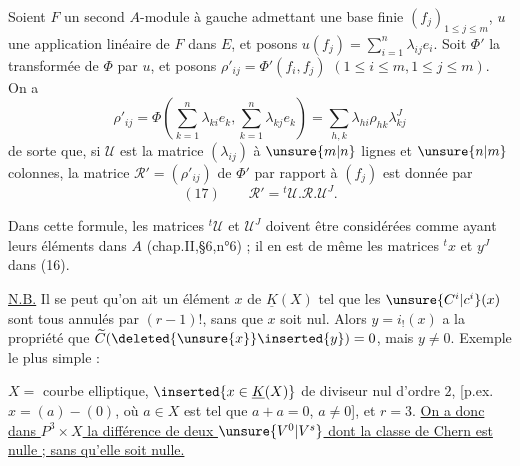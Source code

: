 Soient $F$ un second $A$-module à gauche admettant une base finie $(f_j)_{1\leq j\leq m}$,
$u$ une application linéaire de $F$ dans $E$, et posons
$u(f_j)=\sum_{i=1}^n\lambda_{ij}e_i$. Soit $\Phi'$ la transformée de $\Phi$ par $u$, et posons
$\rho'_{ij}=\Phi'(f_i,f_j)$ $(1\leq i\leq m,1\leq j\leq m)$. On a
\[
\rho'_{ij}=\Phi\left(\sum_{k=1}^n\lambda_{ki}e_k,\sum_{k=1}^n\lambda_{kj}e_k\right)
=\sum_{h,k}\lambda_{hi}\rho_{hk}\lambda_{kj}^J
\]
de sorte que, si $\mathcal U$ est la matrice $(\lambda_{ij})$ à $\unsure{m|n}$ lignes et $\unsure{n|m}$ colonnes,
la matrice $\mathcal R'=(\rho'_{ij})$ de $\Phi'$ par rapport à $(f_j)$ est donnée par
\[
(17)\qquad \mathcal R'={}^t\mathcal U.\mathcal R.\mathcal U^J.
\]

Dans cette formule, les matrices ${}^t\mathcal U$ et $\mathcal U^J$ doivent être considérées comme ayant leurs éléments dans $A$ (chap.II,\S6,n°6) ; il en est de même les matrices ${}^t x$ et $y^J$ dans (16).

\uline{N.B.} Il se peut qu'on ait un élément $x$ de $\underline K(X)$ tel que les
$\unsure{C^i|c^i}(x)$ sont tous annulés par $(r-1)!$, sans que $x$ soit nul.
Alors $y=i_!(x)$ a la propriété que $\widetilde C(\deleted{\unsure{x}}\inserted{y})=0$,
mais $y\ne0$. Exemple le plus simple :

$X=$ courbe elliptique, $\inserted{x\in\underline K(X)}$  de diviseur 
nul d'ordre $2$, [p.ex. $x=(a)-(0)$, où $a\in X$ est tel que $a+a=0$, $a\ne0$], et $r=3$.
\uline{On a donc dans $P^3\times X$ la différence de deux $\unsure{V^0|V^s}$
 dont la classe de Chern est nulle ; sans qu'elle soit nulle.}


